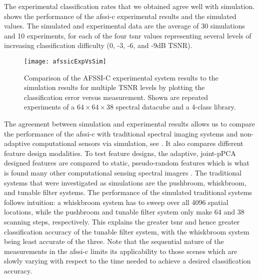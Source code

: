 The experimental classification rates that we obtained agree well with simulation.  shows the performance of the \gls{afssi-c} experimental results and the simulated values. The simulated and experimental data are the average of 30 simulations and 10 experiments, for each of the four \gls{tsnr} values representing several levels of increasing classification difficulty (0, -3, -6, and -9dB TSNR).
%
\begin{figure}[htb]
 	\centering
  	\texttt{[image: afssicExpVsSim]}\\
  	\caption{Comparison of the AFSSI-C experimental system results to the simulation results for multiple TSNR levels by plotting the classification error versus measurement. Shown are repeated experiments of a $64 \times 64 \times 38$ spectral datacube and a 4-class library.}\label{fig:SIMmultiTSNR}
\end{figure}
%
The agreement between simulation and experimental results allows us to compare the performance of the \gls{afssi-c} with traditional spectral imaging systems and non-adaptive computational sensors via simulation, see . It also compares different feature design modalities. To test feature designs, the adaptive, joint-pPCA designed features are compared to static, pseudo-random features which is what is found many other computational sensing spectral imagers \cite{wagadarikar2008single}. The traditional systems that were investigated as simulations are the pushbroom, whiskbroom, and tunable filter systems. The performance of the simulated traditional systems follows intuition: a whiskbroom system has to sweep over all 4096 spatial locations, while the pushbroom and tunable filter system only make 64 and 38 scanning steps, respectively. This explains the greater \gls{tsnr} and hence greater classification accuracy of the tunable filter system, with the whiskbroom system being least accurate of the three. Note that the sequential nature of the measurements in the \gls{afssi-c} limits its applicability to those scenes which are slowly varying with respect to the time needed to achieve a desired classification accuracy.


